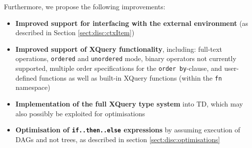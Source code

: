 Furthermore, we propose the following improvements:
\begin{itemize}
  \item \textbf{Improved support for interfacing with the external environment} (as
  described in Section \ref{sect:disc:ctxItem})
  \item \textbf{Improved support of XQuery functionality}, including: full-text
  operations, \texttt{ordered} and \texttt{unordered} mode, binary operators not currently supported,
  multiple order specifications for the \texttt{order by}-clause, and user-defined
  functions as well as built-in XQuery functions (within the \texttt{fn} namespace)
  \item \textbf{Implementation of the full XQuery type system} into TD, which may also
  possibly be exploited for optimisations
  \item \textbf{Optimisation of \texttt{if..then..else} expressions} by assuming
  execution of DAGs and not trees, as described in section
  \ref{sect:disc:optimisations}
\end{itemize}
